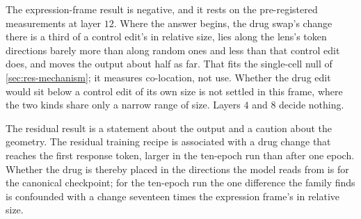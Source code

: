 \begin{claim}
The expression-frame result is negative, and it rests on the pre-registered
measurements at layer $12$. Where the answer begins, the drug swap's change there
is a third of a control edit's in relative size, lies along the lens's token
directions barely more than along random ones and less than that control edit
does, and moves the output about half as far. That fits the single-cell null of
\cref{sec:res-mechanism}; it measures co-location, not use. Whether the drug edit
would sit below a control edit of its own size is not settled in this frame,
where the two kinds share only a narrow range of size. Layers $4$ and $8$ decide
nothing.

The residual result is a statement about the output and a caution about the
geometry. The residual training recipe is associated with a drug change that
reaches the first response token, larger in the ten-epoch run than after one
epoch. Whether the drug is thereby placed in the directions the model reads from
is \notestablished for the canonical checkpoint; for the ten-epoch run the one
difference the family finds is confounded with a change seventeen times the
expression frame's in relative size.
\end{claim}
\claimlede{}
